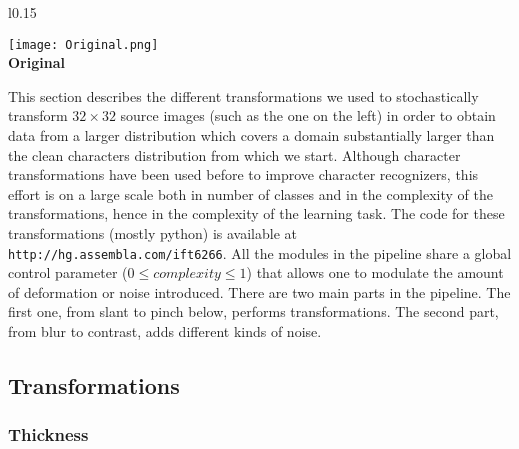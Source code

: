 \documentclass[smallcondensed]{svjour3}     %
\begin{document}
\begin{wrapfigure}[8]{l}{0.15\textwidth}
\begin{center}
\texttt{[image: Original.png]}\\
{\bf Original}
\end{center}
\end{wrapfigure}
This section describes the different transformations we used to stochastically
transform $32 \times 32$ source images (such as the one on the left)
in order to obtain data from a larger distribution which
covers a domain substantially larger than the clean characters distribution from
which we start. 
Although character transformations have been used before to
improve character recognizers, this effort is on a large scale both
in number of classes and in the complexity of the transformations, hence
in the complexity of the learning task.
The code for these transformations (mostly python) is available at 
{\tt http://hg.assembla.com/ift6266}. All the modules in the pipeline share
a global control parameter ($0 \le complexity \le 1$) that allows one to modulate the
amount of deformation or noise introduced. 
There are two main parts in the pipeline. The first one,
from slant to pinch below, performs transformations. The second
part, from blur to contrast, adds different kinds of noise.

\subsection{Transformations}

\subsubsection*{Thickness}
\end{document}
